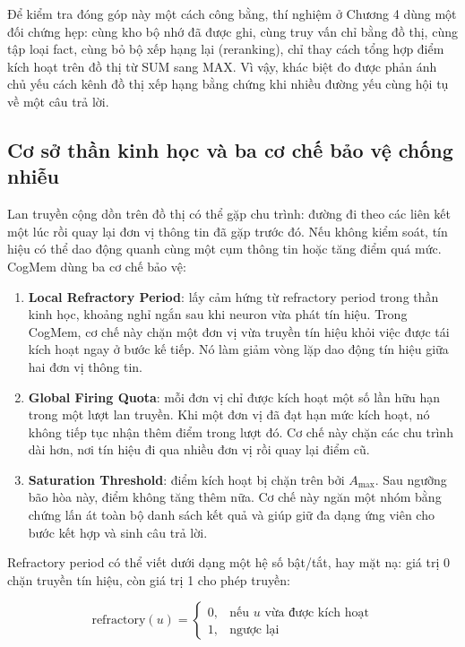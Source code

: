 \documentclass[../main.tex]{subfiles}
\begin{document}
Để kiểm tra đóng góp này một cách công bằng, thí nghiệm ở Chương 4 dùng một đối chứng hẹp: cùng kho bộ nhớ đã được ghi, cùng truy vấn chỉ bằng đồ thị, cùng tập loại fact, cùng bỏ bộ xếp hạng lại (reranking), chỉ thay cách tổng hợp điểm kích hoạt trên đồ thị từ SUM sang MAX. Vì vậy, khác biệt đo được phản ánh chủ yếu cách kênh đồ thị xếp hạng bằng chứng khi nhiều đường yếu cùng hội tụ về một câu trả lời.

\subsection{Cơ sở thần kinh học và ba cơ chế bảo vệ chống nhiễu}

Lan truyền cộng dồn trên đồ thị có thể gặp chu trình: đường đi theo các liên kết một lúc rồi quay lại đơn vị thông tin đã gặp trước đó. Nếu không kiểm soát, tín hiệu có thể dao động quanh cùng một cụm thông tin hoặc tăng điểm quá mức. CogMem dùng ba cơ chế bảo vệ:

\begin{enumerate}
    \item \textbf{Local Refractory Period}: lấy cảm hứng từ refractory period trong thần kinh học, khoảng nghỉ ngắn sau khi neuron vừa phát tín hiệu. Trong CogMem, cơ chế này chặn một đơn vị vừa truyền tín hiệu khỏi việc được tái kích hoạt ngay ở bước kế tiếp. Nó làm giảm vòng lặp dao động tín hiệu giữa hai đơn vị thông tin.
    \item \textbf{Global Firing Quota}: mỗi đơn vị chỉ được kích hoạt một số lần hữu hạn trong một lượt lan truyền. Khi một đơn vị đã đạt hạn mức kích hoạt, nó không tiếp tục nhận thêm điểm trong lượt đó. Cơ chế này chặn các chu trình dài hơn, nơi tín hiệu đi qua nhiều đơn vị rồi quay lại điểm cũ.
    \item \textbf{Saturation Threshold}: điểm kích hoạt bị chặn trên bởi $A_{\max}$. Sau ngưỡng bão hòa này, điểm không tăng thêm nữa. Cơ chế này ngăn một nhóm bằng chứng lấn át toàn bộ danh sách kết quả và giúp giữ đa dạng ứng viên cho bước kết hợp và sinh câu trả lời.
\end{enumerate}

Refractory period có thể viết dưới dạng một hệ số bật/tắt, hay mặt nạ: giá trị 0 chặn truyền tín hiệu, còn giá trị 1 cho phép truyền:

\begin{equation}
\mathrm{refractory}(u) =
\begin{cases}
0, & \text{nếu } u \text{ vừa được kích hoạt} \\
1, & \text{ngược lại}
\end{cases}
\end{equation}
\end{document}
